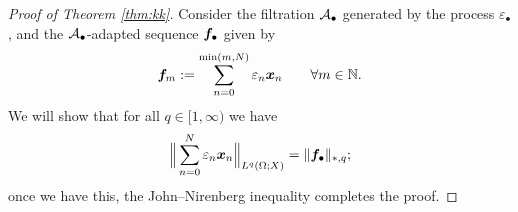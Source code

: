 \begin{proof}[Proof of Theorem \ref{thm:kk}]
  Consider the filtration $\mathcal{A}_{\bullet}$ generated by the process $\varepsilon_{\bullet}$, and the $\mathcal{A}_{\bullet}$-adapted sequence $\bm{f}_{\bullet}$ given by
  \begin{equation*}
    \bm{f}_{m} := \sum_{n=0}^{\min(m,N)} \varepsilon_n \bm{x}_{n} \qquad \forall m \in \mathbb{N}.
  \end{equation*}
  We will show that for all $q \in [1,\infty)$ we have
  \begin{equation}\label{eq:kk-claim}
    \Big\| \sum_{n=0}^N \varepsilon_n \bm{x}_n \Big\|_{L^q(\Omega;X)} = \|\bm{f}_{\bullet}\|_{*,q};
  \end{equation}
  once we have this, the John--Nirenberg inequality completes the proof.


\end{proof}
